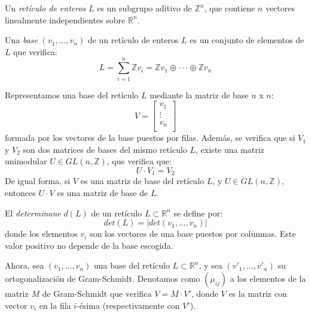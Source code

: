     \begin{definicion} \cite{artLagOdl}
        Un \textit{retículo de enteros} $L$ es un subgrupo aditivo de $\mathbb{Z}^{n}$, que contiene $n$ vectores linealmente independientes sobre $\mathbb{R}^{n}$.
    \end{definicion}

    \begin{definicion} \cite{artLagOdl}
        Una \textit{base} $(v_{1}, ... , v_{n})$ de un retículo de enteros $L$ es un conjunto de elementos de $L$ que verifica:
        \begin{equation}
            L = \sum_{i=1}^{n} \mathbb{Z}v_{i} = \mathbb{Z}v_{1} \oplus \cdot \cdot \cdot \oplus \mathbb{Z}v_{n}
        \end{equation}
    \end{definicion}

    Representamos una base del retículo $L$ mediante la matriz de base $n$ x $n$:
    \begin{equation}
        V = 
        \begin{bmatrix}
            v_{1}  \\
            \vdots \\
            v_{n}  \\
        \end{bmatrix}
    \end{equation}
    formada por los vectores de la base puestos por filas. Además, se verifica que si $V_{1}$ y $V_{2}$ son dos matrices de bases del mismo retículo $L$, existe una matriz unimodular $U \in GL(n, \mathbb{Z})$, que verifica que:
    \begin{equation}
        U \cdot V_{1} = V_{2}
    \end{equation}
    De igual forma, si $V$ es una matriz de base del retículo $L$, y $U \in GL(n, \mathbb{Z})$, entonces $U \cdot V$ es una matriz de base de $L$.

    \begin{definicion} \cite{artLLL}
        El \textit{determinane} $d(L)$ de un retículo $L \subset \mathbb{R}^{n}$ se define por:
        \begin{equation}
            det(L) = \left| det(v_{1}, ... , v_{n}) \right|
        \end{equation}
        donde los elementos $v_{i}$ son los vectores de una base puestos por columnas. Este valor positivo no depende de la base escogida.
    \end{definicion}

    Ahora, sea $(v_{1}, ... , v_{n})$ una base del retículo $L \subset \mathbb{R}^{n}$, y sea $(v'_{1}, ... , v'_{n})$ su ortogonalización de Gram-Schmidt. Denotamos como $(\mu_{ij})$ a los elementos de la matriz $M$ de Gram-Schmidt que verifica $V = M \cdot V'$, donde $V$ es la matriz con vector $v_{i}$ en la fila $i$-ésima (respectivamente con $V'$).
    
